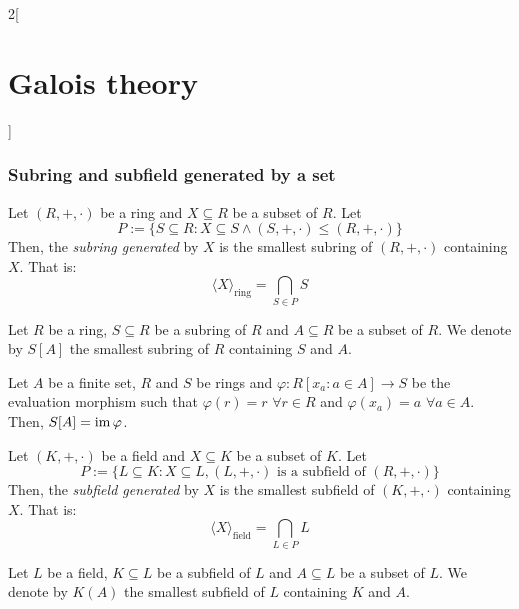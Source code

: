 \documentclass[../../../main_math.tex]{subfiles}
\begin{document}
\begin{multicols}{2}[\section{Galois theory}]
  \subsubsection{Subring and subfield generated by a set}
  \begin{definition}
    Let $(R,+,\cdot)$ be a ring and $X\subseteq R$ be a subset of $R$. Let $$P:=\{S\subseteq R: X\subseteq S\land(S,+,\cdot)\leq(R,+,\cdot)\}$$ Then, the \emph{subring generated} by $X$ is the smallest subring of $(R,+,\cdot)$ containing $X$. That is: $$\langle X\rangle_\text{ring}=\bigcap_{S\in P}S$$
  \end{definition}
  \begin{definition}
    Let $R$ be a ring, $S\subseteq R$ be a subring of $R$ and $A\subseteq R$ be a subset of $R$. We denote by $S[A]$ the smallest subring of $R$ containing $S$ and $A$.
  \end{definition}
  \begin{lemma}
    Let $A$ be a finite set, $R$ and $S$ be rings and $\varphi:R[x_a:a\in A]\rightarrow S$ be the evaluation morphism such that $\varphi(r)=r$ $\forall r\in R$ and $\varphi(x_a)=a$ $\forall a\in A$. Then, $S[A]=\operatorname{im}\varphi$.
  \end{lemma}
  \begin{definition}
    Let $(K,+,\cdot)$ be a field and $X\subseteq K$ be a subset of $K$. Let $$P:=\{L\subseteq K: X\subseteq L,(L,+,\cdot)\text{ is a subfield of }(R,+,\cdot)\}$$ Then, the \emph{subfield generated} by $X$ is the smallest subfield of $(K,+,\cdot)$ containing $X$. That is: $$\langle X\rangle_\text{field}=\bigcap_{L\in P}L$$
  \end{definition}
  \begin{definition}
    Let $L$ be a field, $K\subseteq L$ be a subfield of $L$ and $A\subseteq L$ be a subset of $L$. We denote by $K(A)$ the smallest subfield of $L$ containing $K$ and $A$.
  \end{definition}

\end{multicols}
\end{document}
